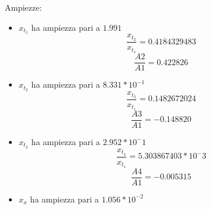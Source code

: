 \documentclass{article}
\begin{document}
Ampiezze:
\begin{itemize}

    \item $x_{t_1}$ ha ampiezza pari a $1.991$
    \begin{equation*} \frac{x_{t_2}}{x_{t_1}} = 0.4184329483 \end{equation*}
     \begin{equation*} 	\frac{A2}{A1} = 0.422826  \end{equation*}
    
    \item $x_{t_2}$ ha ampiezza pari a $ 8.331*10^{-1}$
        \begin{equation*} \frac{x_{t_3}}{x_{t_1}} = 0.1482672024 \end{equation*}
        \begin{equation*}  \frac{A3}{A1} = -0.148820 \end{equation*}
    
    \item $x_{t_3}$ ha ampiezza pari a $2.952*10^-1$
    \begin{equation*} \frac{x_{t_4}}{x_{t_1}} =  5.303867403*10^-3 \end{equation*}
    \begin{equation*}  \frac{A4}{A1} = -0.005315  	 \end{equation*}
    
    \item $	x_{x}$ ha ampiezza pari a $1.056*10^{-2}$
    \end{itemize}
    
\end{document}
